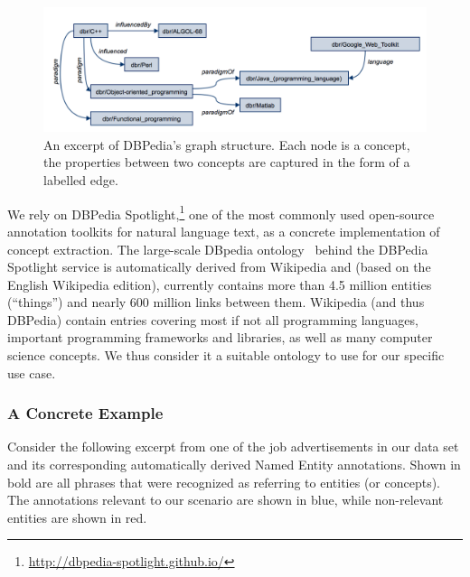 \documentclass[conference]{IEEEtran}
\begin{document}
\begin{figure}[!htb]
\centering
\includegraphics[scale=0.4]{../figs/dbpedia-example-graph.png}
\caption{An excerpt of DBPedia's graph structure. Each node is a concept, the properties between two concepts are captured in the form of a labelled edge.}
\label{fig:dbpedia-example}
\end{figure}

We rely on DBPedia Spotlight,\footnote{\url{http://dbpedia-spotlight.github.io/}}
one of the most commonly used open-source annotation toolkits for natural
language text, as a concrete implementation of concept extraction. The
large-scale DBpedia ontology~\cite{mendes2011dbpedia} behind the DBPedia Spotlight service is
automatically derived from Wikipedia and (based on the English Wikipedia edition),
currently contains more than 4.5 million entities (``things'') and nearly 600
million links between them. Wikipedia (and thus DBPedia) contain entries
covering most if not all programming languages, important programming
frameworks and libraries, as well as many computer science concepts. We thus
consider it a suitable ontology to use for our specific use case.

\subsubsection{A Concrete Example}
Consider the following excerpt from one of the job
advertisements in our data set and its corresponding automatically derived Named
Entity annotations. Shown in bold are all phrases that were recognized as
referring to entities (or concepts). The annotations relevant to our scenario
are shown in blue, while non-relevant entities are shown in red.
\end{document}
